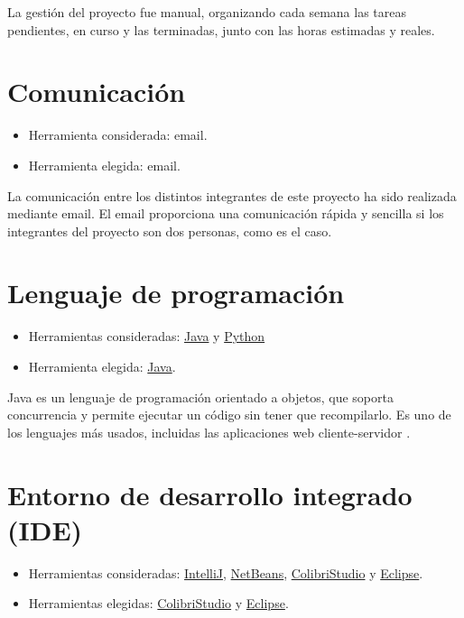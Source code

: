 La gestión del proyecto fue manual, organizando cada semana las tareas pendientes, en curso y las terminadas, junto con las horas estimadas y reales.

\section{Comunicación}

\begin{itemize}
\tightlist
\item
  Herramienta considerada: email.
\item
  Herramienta elegida: email.
\end{itemize}

La comunicación entre los distintos integrantes de este proyecto ha sido realizada mediante email. El email proporciona una comunicación rápida y sencilla si los integrantes del proyecto son dos personas, como es el caso.

\section{Lenguaje de programación}
\begin{itemize}
\tightlist
\item
  Herramientas consideradas: \href{https://www.java.com/es/download/}{Java} y \href{https://www.python.org/}{Python}
\item
  Herramienta elegida: \href{https://www.java.com/es/download/}{Java}.
\end{itemize}

Java es un lenguaje de programación orientado a objetos, que soporta concurrencia y permite ejecutar un código sin tener que recompilarlo. Es uno de los lenguajes más usados, incluidas las aplicaciones web cliente-servidor \cite{java:wiki}.

\section{Entorno de desarrollo integrado (IDE)}

\begin{itemize}
\tightlist
\item
  Herramientas consideradas: \href{https://www.jetbrains.com/idea/}{IntelliJ}, \href{https://netbeans.org/}{NetBeans}, \href{http://gaia.fdi.ucm.es/research/colibri/colibristudio}{ColibriStudio} y \href{https://eclipse.org/}{Eclipse}.
\item
  Herramientas elegidas: \href{http://gaia.fdi.ucm.es/research/colibri/colibristudio}{ColibriStudio} y \href{https://eclipse.org/}{Eclipse}.
\end{itemize}


